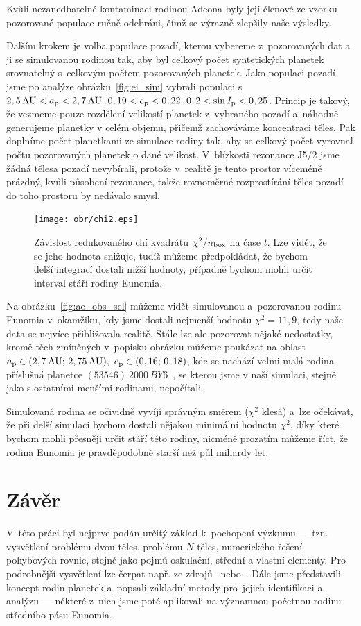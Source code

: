\documentclass[A4paper, 12pt, oneside]{book}
\begin{document}
Kvůli nezanedbatelné kontaminaci rodinou Adeona byly její členové ze vzorku pozorované populace ručně odebráni, čímž se výrazně zlepšily naše výsledky. 

Dalším krokem je volba populace pozadí, kterou vybereme z~pozorovaných dat a~ ji se simulovanou rodinou tak, aby byl celkový počet syntetických planetek srovnatelný s~celkovým počtem pozorovaných planetek. Jako populaci pozadí jsme po analýze obrázku~\ref{fig:ei_sim} vybrali populaci s~$2,5\,{\rm AU}< a_{\rm p} < 2,7\,{\rm AU}\,, 0,19 < e_{\rm p} < 0,22\,, 0,2 < \sin I_{\rm p} < 0,25$. Princip je takový, že vezmeme pouze rozdělení velikostí planetek z~vybraného pozadí a~náhodně generujeme planetky v celém objemu, přičemž zachováváme koncentraci těles. Pak doplníme počet planetkami ze simulace rodiny tak, aby se celkový počet vyrovnal počtu pozorovaných planetek o dané velikost. V~blízkosti rezonance J5/2 jsme žádná tělesa pozadí nevybírali, protože v~realitě je tento prostor víceméně prázdný, kvůli působení rezonance, takže rovnoměrné rozprostírání těles pozadí do toho prostoru by nedávalo smysl.

\begin{figure}
	\centering
	\texttt{[image: obr/chi2.eps]}
	\caption{Závislost redukovaného chí kvadrátu $\chi^2/n_{\rm box}$ na čase $t$. Lze vidět, že se jeho hodnota snižuje, tudíž můžeme předpokládat, že bychom delší integrací dostali nižší hodnoty, případně bychom mohli určit interval stáří rodiny Eunomia.} \label{fig:chi2}
\end{figure}

Na obrázku~\ref{fig:ae_obs_scl} můžeme vidět simulovanou a~pozorovanou rodinu Eunomia v~okamžiku, kdy jsme dostali nejmenší hodnotu $\chi^2=11,9$, tedy naše data se nejvíce přibližovala realitě. Stále lze ale pozorovat nějaké nedostatky, kromě těch zmíněných v~popisku obrázku můžeme poukázat na oblast $a_{\rm p}\in(2,7\,{\rm AU};\,2,75\,{\rm AU}),\ e_{\rm p}\in(0,16;\,0,18)$, kde se nachází velmi malá rodina příslušná planetce $(53546)\ 2000\,BY6$~\cite{milani14}, se kterou jsme v naší simulaci, stejně jako s ostatními menšími rodinami, nepočítali.

Simulovaná rodina se očividně vyvíjí správným směrem ($\chi^2$ klesá) a~lze očekávat, že při delší simulaci bychom dostali nějakou minimální hodnotu $\chi^2$, díky které bychom mohli přesněji určit stáří této rodiny, nicméně prozatím můžeme říct, že rodina Eunomia je pravděpodobně starší než půl miliardy let.

\chapter*{Závěr} \label{ch:zaver} 
V~této práci byl nejprve podán určitý základ k~pochopení výzkumu --- tzn. vysvětlení problému dvou těles, problému $N$ těles, numerického řešení pohybových rovnic, stejně jako pojmů oskulační, střední a vlastní elementy. Pro podrobnější vysvětlení lze čerpat např. ze zdrojů~\cite{murray00} nebo~\cite{fmt}. Dále jsme představili koncept rodin planetek a~popsali základní metody pro~jejich identifikaci a analýzu --- některé z~nich jsme poté aplikovali na významnou početnou rodinu středního pásu Eunomia.
\end{document}
